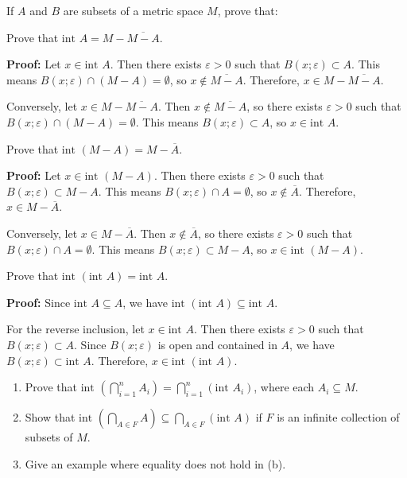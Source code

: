 If $A$ and $B$ are subsets of a metric space $M$, prove that:

\begin{problembox}
Prove that \(\text{int } A = M - \overline{M - A}\).
\end{problembox}

\textbf{Proof:} Let $x \in \text{int } A$. Then there exists $\varepsilon > 0$ such that $B(x;\varepsilon) \subset A$. This means $B(x;\varepsilon) \cap (M - A) = \emptyset$, so $x \notin \overline{M - A}$. Therefore, $x \in M - \overline{M - A}$.

Conversely, let $x \in M - \overline{M - A}$. Then $x \notin \overline{M - A}$, so there exists $\varepsilon > 0$ such that $B(x;\varepsilon) \cap (M - A) = \emptyset$. This means $B(x;\varepsilon) \subset A$, so $x \in \text{int } A$.

\begin{problembox}
Prove that \(\text{int }(M - A) = M - \overline{A}\).
\end{problembox}

\textbf{Proof:} Let $x \in \text{int }(M - A)$. Then there exists $\varepsilon > 0$ such that $B(x;\varepsilon) \subset M - A$. This means $B(x;\varepsilon) \cap A = \emptyset$, so $x \notin \overline{A}$. Therefore, $x \in M - \overline{A}$.

Conversely, let $x \in M - \overline{A}$. Then $x \notin \overline{A}$, so there exists $\varepsilon > 0$ such that $B(x;\varepsilon) \cap A = \emptyset$. This means $B(x;\varepsilon) \subset M - A$, so $x \in \text{int }(M - A)$.

\begin{problembox}
Prove that \(\text{int }(\text{int } A) = \text{int } A\).
\end{problembox}

\textbf{Proof:} Since $\text{int } A \subseteq A$, we have $\text{int }(\text{int } A) \subseteq \text{int } A$.

For the reverse inclusion, let $x \in \text{int } A$. Then there exists $\varepsilon > 0$ such that $B(x;\varepsilon) \subset A$. Since $B(x;\varepsilon)$ is open and contained in $A$, we have $B(x;\varepsilon) \subset \text{int } A$. Therefore, $x \in \text{int }(\text{int } A)$.

\begin{problembox}
\begin{enumerate}[label=\alph*)]
\item Prove that \(\text{int } \left(\bigcap_{i=1}^n A_i\right) = \bigcap_{i=1}^n (\text{int } A_i)\), where each \( A_i \subseteq M \).
\item Show that \(\text{int } \left(\bigcap_{A \in F} A\right) \subseteq \bigcap_{A \in F} (\text{int } A)\) if \( F \) is an infinite collection of subsets of \( M \).
\item Give an example where equality does not hold in (b).
\end{enumerate}
\end{problembox}

